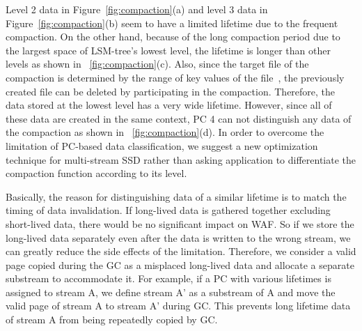 Level 2 data in Figure~\ref{fig:compaction}(a) and 
level 3 data in Figure~\ref{fig:compaction}(b) seem to have 
a limited lifetime due to the frequent compaction.
On the other hand, because of the long compaction period 
due to the largest space of LSM-tree's lowest level, 
the lifetime is longer than other levels as shown in ~\ref{fig:compaction}(c).
Also, since the target file of the compaction is determined 
by the range of key values of the file~\cite{RocksDB}, 
the previously created file can be deleted 
by participating in the compaction. 
Therefore, the data stored at the lowest level has a very wide lifetime.
However, since all of these data are created in the same context, 
PC 4 can not distinguish any data of the compaction as shown in ~\ref{fig:compaction}(d).
In order to overcome the limitation of PC-based data classification,
we suggest a new optimization technique for multi-stream SSD 
rather than asking application to differentiate the compaction function according to its level.

Basically, the reason for distinguishing data of a similar lifetime is 
to match the timing of data invalidation. 
If long-lived data is gathered together excluding short-lived data, 
there would be no significant impact on WAF. 
So if we store the long-lived data separately even after 
the data is written to the wrong stream, 
we can greatly reduce the side effects of the limitation. 
Therefore, we consider a valid page copied during the GC 
as a misplaced long-lived data 
and allocate a separate substream to accommodate it. 
For example, if a PC with various lifetimes is assigned to stream A, 
we define stream A' as a substream of A and 
move the valid page of stream A to stream A' during GC. 
This prevents long lifetime data of stream A from being repeatedly copied 
by GC.



